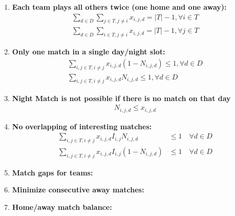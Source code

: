 \documentclass[a4paper, 12pt]{article}
\begin{document}
\begin{enumerate}
    \item \textbf{Each team plays all others twice (one home and one away):}
    \begin{align*}
        \sum_{d \in D} \sum_{j \in T, j \neq i} x_{i,j,d} = |T| - 1 , \forall i \in T \\
        \sum_{d \in D} \sum_{i \in T, j \neq i} x_{i,j,d} = |T| - 1 , \forall j \in T 
    \end{align*}

    \item \textbf{Only one match in a single day/night slot:}
    \begin{align*}
        \sum_{i,j \in T, i \neq j} x_{i,j,d} (1-N_{i,j,d}) \leq 1, \forall d \in D \\
        \sum_{i,j \in T, i \neq j} x_{i,j,d} N_{i,j,d} \leq 1, \forall d \in D 
    \end{align*}

    \item \textbf{Night Match is not possible if there is no match on that day}
    \begin{align*}
        N_{i,j,d} \leq x_{i,j,d}
    \end{align*}

    \item \textbf{No overlapping of interesting matches:}
    \begin{align*}
        \sum_{i,j \in T, i \neq j} x_{i,j,d} I_{i,j} N_{i,j,d} &\leq 1 \quad \forall d \in D \\
        \sum_{i,j \in T, i \neq j} x_{i,j,d} I_{i,j} (1 - N_{i,j,d}) &\leq 1 \quad \forall d \in D
    \end{align*}

    \item \textbf{Match gaps for teams:}

    \item \textbf{Minimize consecutive away matches:}

    \item \textbf{Home/away match balance:}


\end{enumerate}
\end{document}
